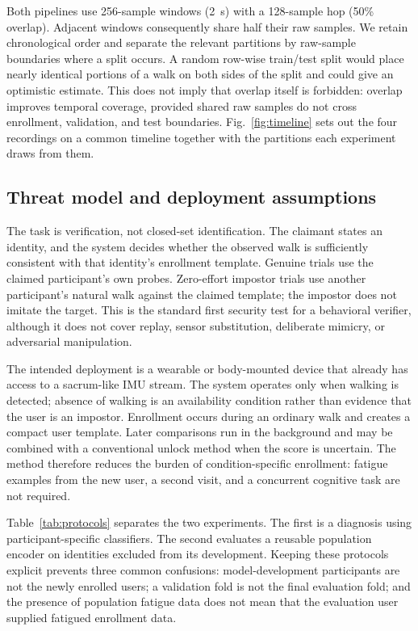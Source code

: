 \documentclass[conference]{IEEEtran}
\begin{document}
Both pipelines use 256-sample windows (2~s) with a 128-sample hop (50\% overlap). Adjacent windows consequently share half their raw samples. We retain chronological order and separate the relevant partitions by raw-sample boundaries where a split occurs. A random row-wise train/test split would place nearly identical portions of a walk on both sides of the split and could give an optimistic estimate. This does not imply that overlap itself is forbidden: overlap improves temporal coverage, provided shared raw samples do not cross enrollment, validation, and test boundaries. Fig.~\ref{fig:timeline} sets out the four recordings on a common timeline together with the partitions each experiment draws from them.

\subsection{Threat model and deployment assumptions}
The task is verification, not closed-set identification. The claimant states an identity, and the system decides whether the observed walk is sufficiently consistent with that identity's enrollment template. Genuine trials use the claimed participant's own probes. Zero-effort impostor trials use another participant's natural walk against the claimed template; the impostor does not imitate the target. This is the standard first security test for a behavioral verifier, although it does not cover replay, sensor substitution, deliberate mimicry, or adversarial manipulation.

The intended deployment is a wearable or body-mounted device that already has access to a sacrum-like IMU stream. The system operates only when walking is detected; absence of walking is an availability condition rather than evidence that the user is an impostor. Enrollment occurs during an ordinary walk and creates a compact user template. Later comparisons run in the background and may be combined with a conventional unlock method when the score is uncertain. The method therefore reduces the burden of condition-specific enrollment: fatigue examples from the new user, a second visit, and a concurrent cognitive task are not required.

Table~\ref{tab:protocols} separates the two experiments. The first is a diagnosis using participant-specific classifiers. The second evaluates a reusable population encoder on identities excluded from its development. Keeping these protocols explicit prevents three common confusions: model-development participants are not the newly enrolled users; a validation fold is not the final evaluation fold; and the presence of population fatigue data does not mean that the evaluation user supplied fatigued enrollment data.
\end{document}
